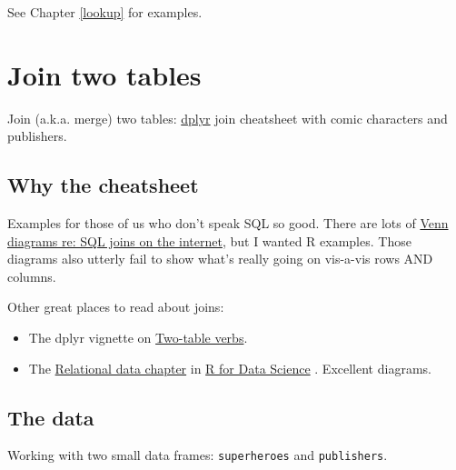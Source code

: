 \documentclass[
]{book}
\providecommand{\tightlist}{%
  \setlength{\itemsep}{0pt}\setlength{\parskip}{0pt}}
\begin{document}
See Chapter \ref{lookup} for examples.

\hypertarget{join-cheatsheet}{%
\chapter{Join two tables}\label{join-cheatsheet}}

Join (a.k.a. merge) two tables: \href{https://dplyr.tidyverse.org}{dplyr} join cheatsheet with comic characters and publishers.

\hypertarget{why-the-cheatsheet}{%
\section{Why the cheatsheet}\label{why-the-cheatsheet}}

Examples for those of us who don't speak SQL so good. There are lots of \href{https://www.google.com/search?q=sql+join\&tbm=isch}{Venn diagrams re: SQL joins on the internet}, but I wanted R examples. Those diagrams also utterly fail to show what's really going on vis-a-vis rows AND columns.

Other great places to read about joins:

\begin{itemize}
\tightlist
\item
  The dplyr vignette on \href{https://dplyr.tidyverse.org/articles/two-table.html}{Two-table verbs}.
\item
  The \href{https://r4ds.had.co.nz/relational-data.html}{Relational data chapter} in \href{https://r4ds.had.co.nz}{R for Data Science} \citep{wickham2016}. Excellent diagrams.
\end{itemize}

\hypertarget{the-data}{%
\section{The data}\label{the-data}}

Working with two small data frames: \texttt{superheroes} and \texttt{publishers}.
\end{document}
